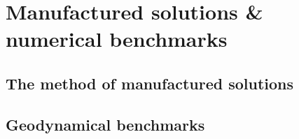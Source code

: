 \chapter{Manufactured solutions \& numerical benchmarks} %

\section{The method of manufactured solutions \label{mms}}  %

\section{Geodynamical benchmarks}\label{sec:geobench}  %
